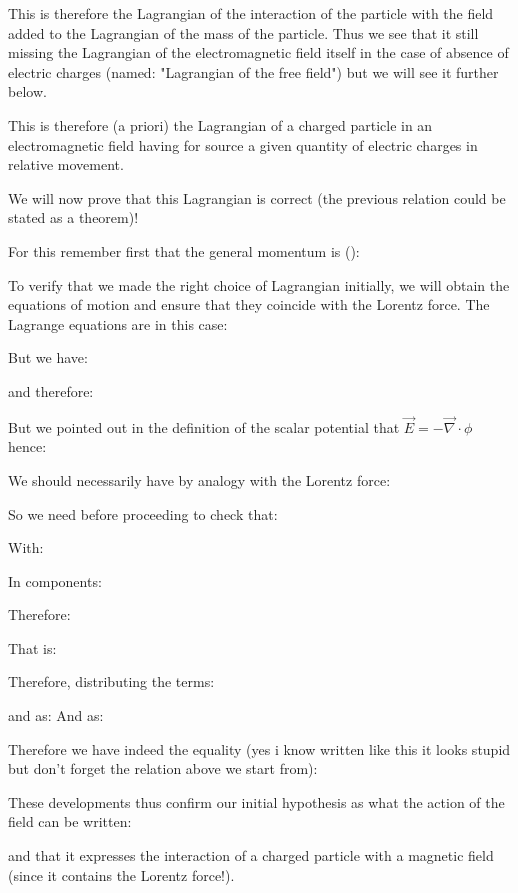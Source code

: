 	\begin{tcolorbox}[title=Remark,colframe=black,arc=10pt]
	This is therefore the Lagrangian of the interaction of the particle with the field added to the Lagrangian of the mass of the particle. Thus we see that it still missing the Lagrangian of the electromagnetic field itself in the case of absence of electric charges (named: "Lagrangian of the free field") but we will see it further below.
	\end{tcolorbox}
	This is therefore (a priori) the Lagrangian of a charged particle in an electromagnetic field having for source a given quantity of electric charges in relative movement.
	
	We will now prove that this Lagrangian is correct (the previous relation could be stated as a theorem)!
	
	For this remember first that the general momentum is ():
	
	To verify that we made the right choice of Lagrangian initially, we will obtain the equations of motion and ensure that they coincide with the Lorentz force. The Lagrange equations are in this case:
	
	But we have:
	
	and therefore:
	
	But we pointed out in the definition of the scalar potential that $\vec{E}=-\vec{\nabla}\cdot\phi$ hence:
	
	We should necessarily have by analogy with the Lorentz force:
	
	So we need before proceeding to check that:
	
	With:
	
	In components:
	
	Therefore:
	
	That is:
	
	Therefore, distributing the terms:
	
	and as:
	And as:
	
	Therefore we have indeed the equality (yes i know written like this it looks stupid but don't forget the relation above we start from):
	
	These developments thus confirm our initial hypothesis as what the action of the field can be written:
	
	and that it expresses the interaction of a charged particle with a magnetic field (since it contains the Lorentz force!).

